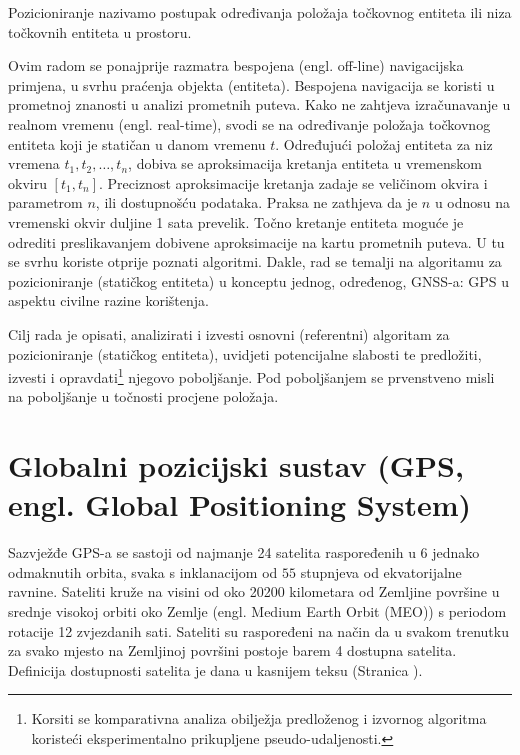 \documentclass[a4paper,twoside,12pt]{memoir} %
\begin{document}
\begin{intro}
	\begin{defn}[Pozicioniranje]
		Pozicioniranje nazivamo postupak određivanja položaja točkovnog entiteta ili niza 
		točkovnih entiteta u prostoru.
	\end{defn}
	Ovim radom se ponajprije razmatra bespojena (engl. off-line) navigacijska primjena, u svrhu praćenja objekta (entiteta).
	Bespojena navigacija se koristi u prometnoj znanosti u analizi prometnih puteva. Kako ne zahtjeva izračunavanje u realnom vremenu (engl. real-time),
	svodi se na određivanje položaja točkovnog entiteta koji je statičan u danom vremenu $t$.
	Određujući položaj entiteta za niz vremena $ t_1,t_2, \hdots ,t_n $, dobiva se 
	aproksimacija kretanja entiteta u vremenskom okviru $[t_1,t_n]$.
	Preciznost aproksimacije kretanja zadaje se veličinom okvira i parametrom $n$, ili dostupnošću podataka.
	Praksa ne zathjeva da je $n$ u odnosu na vremenski okvir duljine 1 sata prevelik.
	Točno kretanje entiteta moguće je
	odrediti preslikavanjem dobivene aproksimacije na kartu prometnih puteva.
	U tu se svrhu koriste otprije poznati algoritmi.
	Dakle, rad se temalji na algoritamu za pozicioniranje (statičkog entiteta)
	u konceptu jednog, određenog, GNSS-a: GPS u aspektu civilne razine korištenja.
	
	Cilj rada je opisati, analizirati i izvesti osnovni (referentni) algoritam za pozicioniranje (statičkog entiteta), uvidjeti potencijalne slabosti te predložiti, izvesti i opravdati\footnote{Korsiti se komparativna analiza obilježja predloženog i izvornog algoritma koristeći eksperimentalno prikupljene pseudo-udaljenosti.} njegovo poboljšanje.
	Pod poboljšanjem se prvenstveno misli na poboljšanje u točnosti procjene položaja.
\end{intro}
\chapter[Globalni pozicijski sustav (GPS)][GPS]{Globalni pozicijski sustav (GPS, engl. Global Positioning System)}
	Sazvježđe GPS-a se sastoji od najmanje 24 satelita raspoređenih u 6 jednako odmaknutih orbita, svaka s inklanacijom od $55$ stupnjeva od ekvatorijalne
	ravnine.
	Sateliti kruže na visini od oko 20200 kilometara od Zemljine površine u srednje visokoj orbiti oko Zemlje (engl. Medium Earth Orbit (MEO)) s periodom rotacije 12 zvjezdanih sati. 
	Sateliti su raspoređeni na način da u svakom trenutku za svako mjesto na Zemljinoj površini postoje barem 4 dostupna satelita. Definicija dostupnosti satelita je dana u kasnijem teksu (Stranica \pageref{stranica:dostupnost}).
	
\end{document}
